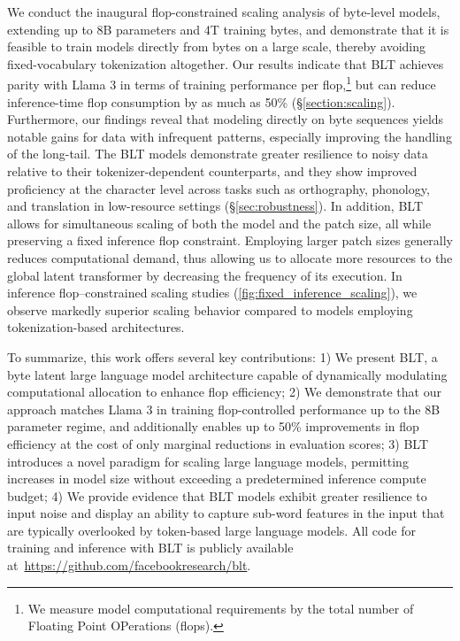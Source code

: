 We conduct the inaugural flop-constrained scaling analysis of byte-level models, extending up to 8B parameters and 4T training bytes, and demonstrate that it is feasible to train models directly from bytes on a large scale, thereby avoiding fixed-vocabulary tokenization altogether. Our results indicate that {\textsc BLT} achieves parity with Llama 3 in terms of training performance per flop,\footnote{We measure model computational requirements by the total number of Floating Point OPerations (flops).} but can reduce inference-time flop consumption by as much as 50\% (\S\ref{section:scaling}). Furthermore, our findings reveal that modeling directly on byte sequences yields notable gains for data with infrequent patterns, especially improving the handling of the long-tail. The {\textsc BLT} models demonstrate greater resilience to noisy data relative to their tokenizer-dependent counterparts, and they show improved proficiency at the character level across tasks such as orthography, phonology, and translation in low-resource settings (\S\ref{sec:robustness}). In addition, {\textsc BLT} allows for simultaneous scaling of both the model and the patch size, all while preserving a fixed inference flop constraint. Employing larger patch sizes generally reduces computational demand, thus allowing us to allocate more resources to the global latent transformer by decreasing the frequency of its execution. In inference flop–constrained scaling studies (\autoref{fig:fixed_inference_scaling}), we observe markedly superior scaling behavior compared to models employing tokenization-based architectures.

To summarize, this work offers several key contributions: 1) We present {\textsc BLT}, a byte latent large language model architecture capable of dynamically modulating computational allocation to enhance flop efficiency; 2) We demonstrate that our approach matches Llama 3 in training flop-controlled performance up to the 8B parameter regime, and additionally enables up to 50\% improvements in flop efficiency at the cost of only marginal reductions in evaluation scores; 3) {\textsc BLT} introduces a novel paradigm for scaling large language models, permitting increases in model size without exceeding a predetermined inference compute budget; 4) We provide evidence that {\textsc BLT} models exhibit greater resilience to input noise and display an ability to capture sub-word features in the input that are typically overlooked by token-based large language models. All code for training and inference with {\textsc BLT} is publicly available at~\url{https://github.com/facebookresearch/blt}.

